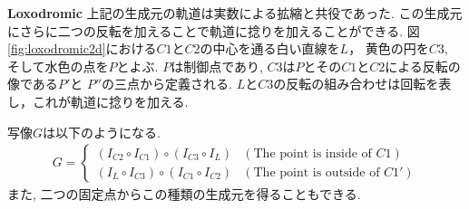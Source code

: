 \noindent\textbf{Loxodromic}
上記の生成元の軌道は実数による拡縮と共役であった.
この生成元にさらに二つの反転を加えることで軌道に捻りを加えることができる.
図\ref{fig:loxodromic2d}における$C1$と$C2$の中心を通る白い直線を$L$，
黄色の円を$C3$, そして水色の点を$P$とよぶ.
$P$は制御点であり, $C3$は$P$とその$C1$と$C2$による反転の像である$P'$と
$P''$の三点から定義される.
$L$と$C3$の反転の組み合わせは回転を表し，これが軌道に捻りを加える.

写像$G$は以下のようになる.
\begin{align*}
G =
\begin{cases}
 (I_{C2} \circ I_{C1}) \circ (I_{C3} \circ I_L) & (\text{The point is inside of } C1) \\
 (I_L \circ I_{C3}) \circ (I_{C1} \circ I_{C2}) & (\text{The point is outside of }C1')
\end{cases}
\end{align*}
また, 二つの固定点からこの種類の生成元を得ることもできる.

